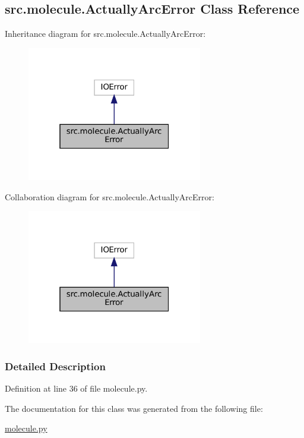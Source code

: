 \hypertarget{classsrc_1_1molecule_1_1ActuallyArcError}{}\subsection{src.\+molecule.\+Actually\+Arc\+Error Class Reference}
\label{classsrc_1_1molecule_1_1ActuallyArcError}


Inheritance diagram for src.\+molecule.\+Actually\+Arc\+Error\+:
\nopagebreak
\begin{figure}[H]
\begin{center}
\leavevmode
\includegraphics[width=217pt]{classsrc_1_1molecule_1_1ActuallyArcError__inherit__graph}
\end{center}
\end{figure}


Collaboration diagram for src.\+molecule.\+Actually\+Arc\+Error\+:
\nopagebreak
\begin{figure}[H]
\begin{center}
\leavevmode
\includegraphics[width=217pt]{classsrc_1_1molecule_1_1ActuallyArcError__coll__graph}
\end{center}
\end{figure}


\subsubsection{Detailed Description}


Definition at line 36 of file molecule.\+py.



The documentation for this class was generated from the following file\+:\begin{DoxyCompactItemize}
\item 
\hyperlink{molecule_8py}{molecule.\+py}\end{DoxyCompactItemize}
